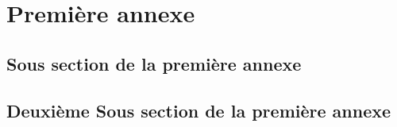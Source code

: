 \section{Première annexe}
\subsection{Sous section de la première annexe}
\subsection{Deuxième Sous section de la première annexe}